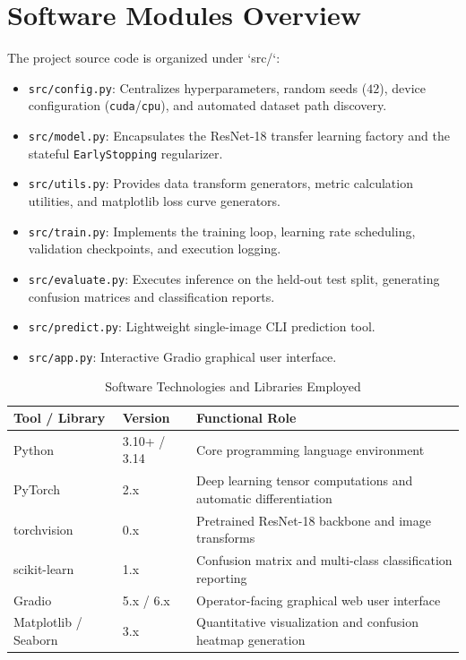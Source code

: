 \documentclass[12pt,a4paper]{report}
\begin{document}
\section{Software Modules Overview}
The project source code is organized under `src/`:
\begin{itemize}
    \item \texttt{src/config.py}: Centralizes hyperparameters, random seeds ($42$), device configuration (\texttt{cuda}/\texttt{cpu}), and automated dataset path discovery.
    \item \texttt{src/model.py}: Encapsulates the ResNet-18 transfer learning factory and the stateful \texttt{EarlyStopping} regularizer.
    \item \texttt{src/utils.py}: Provides data transform generators, metric calculation utilities, and matplotlib loss curve generators.
    \item \texttt{src/train.py}: Implements the training loop, learning rate scheduling, validation checkpoints, and execution logging.
    \item \texttt{src/evaluate.py}: Executes inference on the held-out test split, generating confusion matrices and classification reports.
    \item \texttt{src/predict.py}: Lightweight single-image CLI prediction tool.
    \item \texttt{src/app.py}: Interactive Gradio graphical user interface.
\end{itemize}

\begin{table}[h]
\centering
\caption{Software Technologies and Libraries Employed}
\label{tab:tech}
\small
\begin{tabular}{lll}
\toprule
\textbf{Tool / Library} & \textbf{Version} & \textbf{Functional Role} \\
\midrule
Python & 3.10+ / 3.14 & Core programming language environment \\
PyTorch & 2.x & Deep learning tensor computations and automatic differentiation \\
torchvision & 0.x & Pretrained ResNet-18 backbone and image transforms \\
scikit-learn & 1.x & Confusion matrix and multi-class classification reporting \\
Gradio & 5.x / 6.x & Operator-facing graphical web user interface \\
Matplotlib / Seaborn & 3.x & Quantitative visualization and confusion heatmap generation \\
\bottomrule
\end{tabular}
\end{table}
\end{document}
